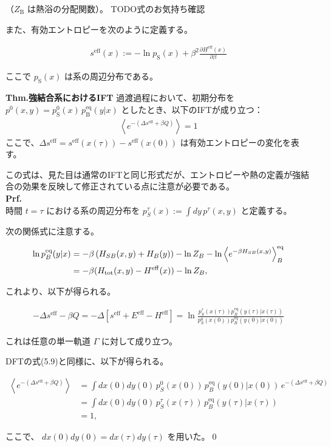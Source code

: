 \documentclass[a4paper,11pt]{jsarticle}
\numberwithin{equation}{section}
\begin{document}
（$Z_{\text{B}}$ は熱浴の分配関数）。
TODO式のお気持ち確認

また、有効エントロピーを次のように定義する。

\begin{align}
s^{\mathrm{eff}}(x)
:= - \ln p_{\text{S}}(x) + \beta^2 \frac{\partial H^{\mathrm{eff}}(x)}{\partial \beta}
\end{align}

ここで $p_{\text{S}}(x)$ は系の周辺分布である。

\begin{itembox}[l]{\textbf{Thm.強結合系におけるIFT}}
過渡過程において、初期分布を $p^0(x, y) = p_{\text{S}}^0(x)\, p_{\text{B}}^{\mathrm{eq}}(y | x)$ としたとき、以下のIFTが成り立つ：
\begin{align}
\left\langle e^{ -(\Delta s^{\mathrm{eff}} + \beta Q) } \right\rangle = 1
\end{align}
ここで、$\Delta s^{\mathrm{eff}} = s^{\mathrm{eff}}(x(\tau)) - s^{\mathrm{eff}}(x(0))$ は有効エントロピーの変化を表す。
\end{itembox}
この式は、見た目は通常のIFTと同じ形式だが、エントロピーや熱の定義が強結合の効果を反映して修正されている点に注意が必要である。\\
\textbf{Prf.}\\
時間 $t = \tau$ における系の周辺分布を $p_S^\tau(x) := \int dy\, p^\tau(x, y)$ と定義する。

次の関係式に注意する。

\begin{align}
\ln p_B^{\mathrm{eq}}(y | x) &= -\beta \left( H_{SB}(x, y) + H_B(y) \right) - \ln Z_B 
- \ln \left\langle e^{-\beta H_{SB}(x, y)} \right\rangle^{\mathrm{eq}}_B \notag \\
&= -\beta (H_{\mathrm{tot}}(x, y) - H^{\mathrm{eff}}(x)) - \ln Z_B,
\end{align}

これより、以下が得られる。

\begin{align}
-\Delta s^{\mathrm{eff}} - \beta Q 
= - \Delta \left[ s^{\mathrm{eff}} + E^{\mathrm{eff}} - H^{\mathrm{eff}} \right]
= \ln \frac{ p_S^{\tau}(x(\tau)) p_B^{\mathrm{eq}}(y(\tau) | x(\tau)) }{ p_S^0(x(0)) p_B^{\mathrm{eq}}(y(0) | x(0)) }
\end{align}

これは任意の単一軌道 $\Gamma$ に対して成り立つ。

DFTの式(5.9)と同様に、以下が得られる。

\begin{align}
\left\langle e^{- ( \Delta s^{\mathrm{eff}} + \beta Q )} \right\rangle 
&= \int dx(0) dy(0)\, p_S^0(x(0))\, p_B^{\mathrm{eq}}(y(0) | x(0))\, e^{ - ( \Delta s^{\mathrm{eff}} + \beta Q ) } \\
&= \int dx(0) dy(0)\, p_S^\tau(x(\tau))\, p_B^{\mathrm{eq}}(y(\tau) | x(\tau)) \\
&= 1,
\end{align}

ここで、 $dx(0) dy(0) = dx(\tau) dy(\tau)$ を用いた。\qed\\
\end{document}
